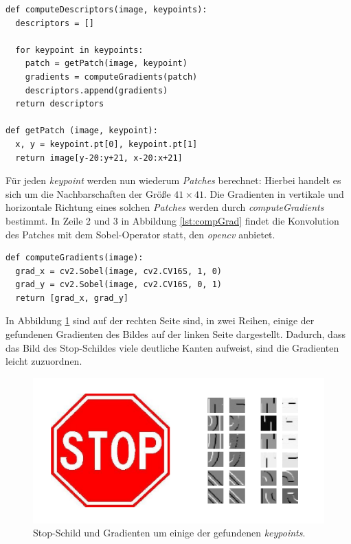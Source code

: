 \lstset{language=Python}
\begin{lstlisting}
def computeDescriptors(image, keypoints):
  descriptors = []
  
  for keypoint in keypoints:
  	patch = getPatch(image, keypoint)
  	gradients = computeGradients(patch)
  	descriptors.append(gradients)
  return descriptors
  
def getPatch (image, keypoint):
  x, y = keypoint.pt[0], keypoint.pt[1]
  return image[y-20:y+21, x-20:x+21]
\end{lstlisting}

Für jeden \textit{keypoint} werden nun wiederum \textit{Patches} berechnet: Hierbei handelt es sich um die Nachbarschaften der Größe $41 \times 41$. Die Gradienten in vertikale und horizontale Richtung eines solchen \textit{Patches} werden durch \textit{computeGradients} bestimmt. In Zeile 2 und 3 in Abbildung \ref{lst:compGrad} findet die Konvolution des Patches mit dem Sobel-Operator statt, den \textit{opencv} anbietet.

\begin{lstlisting}
def computeGradients(image):
  grad_x = cv2.Sobel(image, cv2.CV16S, 1, 0)
  grad_y = cv2.Sobel(image, cv2.CV16S, 0, 1)
  return [grad_x, grad_y]
\end{lstlisting}

In Abbildung \ref{img:gradients} sind auf der rechten Seite sind, in zwei Reihen, einige der gefundenen Gradienten des Bildes auf der linken Seite dargestellt. Dadurch, dass das Bild des Stop-Schildes viele deutliche Kanten aufweist, sind die Gradienten leicht zuzuordnen.

\begin{figure}
	\centering
	\includegraphics[scale=0.65]{images/gradients_patch.png}
	\caption{Stop-Schild und Gradienten um einige der gefundenen \textit{keypoints}.}
	\label{img:gradients}
\end{figure}

